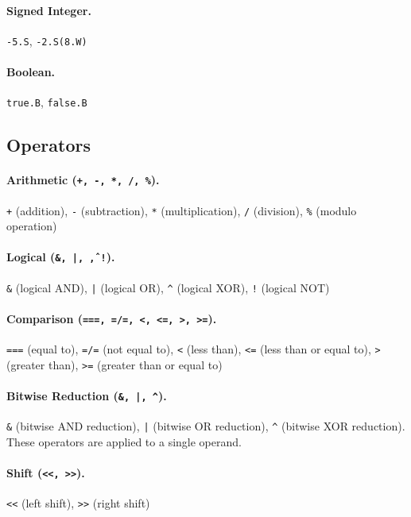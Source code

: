 \paragraph{Signed Integer.} \texttt{-5.S}, \texttt{-2.S(8.W)}

\paragraph{Boolean.} \texttt{true.B}, \texttt{false.B}

\subsection{Operators} 
\paragraph{Arithmetic (\texttt{+, -, *, /, \%}).} \texttt{+} (addition), \texttt{-} (subtraction), \texttt{*} (multiplication), \texttt{/} (division), \texttt{\%} (modulo operation)

\paragraph{Logical (\texttt{\&, |, \^, !}).} \texttt{\&} (logical AND), \texttt{|} (logical OR), \texttt{\^{}} (logical XOR), \texttt{!} (logical NOT)

\paragraph{Comparison (\texttt{===, =/=, <, <=, >, >=}).} \texttt{===} (equal to), \texttt{=/=} (not equal to), \texttt{<} (less than), \texttt{<=} (less than or equal to), \texttt{>} (greater than), \texttt{>=} (greater than or equal to)

\paragraph{Bitwise Reduction (\texttt{\&, |, \^}).} \texttt{\&} (bitwise AND reduction), \texttt{|} (bitwise OR reduction), \texttt{\^{}} (bitwise XOR reduction). These operators are applied to a single operand.

\paragraph{Shift (\texttt{<<, >>}).} \texttt{<<} (left shift), \texttt{>>} (right shift)

